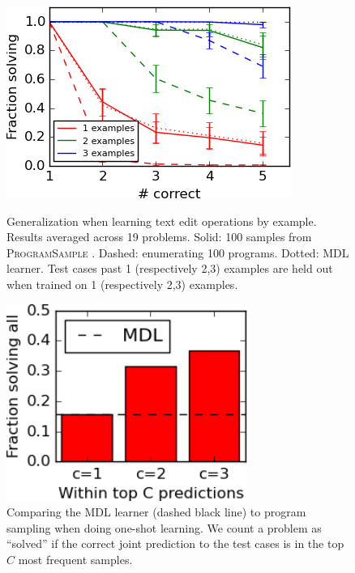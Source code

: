 \documentclass{article}
\newcommand{\theSystem}{\textsc{ProgramSample}}
\begin{document}
\begin{figure}[h]\centering
  \begin{minipage}{0.45\textwidth}\centering
    \includegraphics[width=\textwidth]{smallFractionSolving.png}
  \caption{Generalization when learning text edit operations by example. Results averaged across 19 problems. Solid: 100 samples from \theSystem{} . Dashed: enumerating 100 programs. Dotted: MDL learner. Test cases past 1 (respectively 2,3) examples are held out when trained on 1 (respectively 2,3) examples.}\label{flashPerformance}        \end{minipage}%
\hspace{0.1\textwidth}\begin{minipage}{0.45\textwidth}\centering
    \includegraphics[width=0.7\textwidth]{small_mdl.png}
    \caption{Comparing the MDL learner (dashed black line) to program sampling when doing one-shot learning. We count a problem as ``solved'' if  the correct joint prediction to the test cases is in the top $C$ most frequent samples.}\label{mdl}
  \end{minipage}
\end{figure}
 
\end{document}
